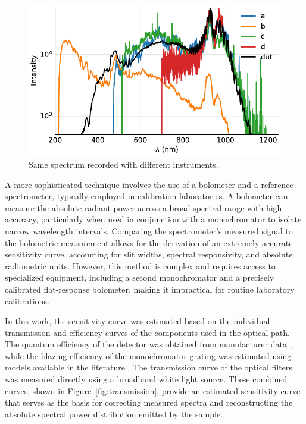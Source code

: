 \documentclass[
	parskip=half,
	a4paper,
]{scrarticle}
\begin{document}
\begin{figure}
    \centering
    \includegraphics{../analysis/figures/efficiency_different.pdf}
    \caption{Same spectrum recorded with different instruments.}
\end{figure}

A more sophisticated technique involves the use of a bolometer and a reference spectrometer, typically employed in calibration laboratories. A bolometer can measure the absolute radiant power across a broad spectral range with high accuracy, particularly when used in conjunction with a monochromator to isolate narrow wavelength intervals. Comparing the spectrometer's measured signal to the bolometric measurement allows for the derivation of an extremely accurate sensitivity curve, accounting for slit widths, spectral responsivity, and absolute radiometric units. However, this method is complex and requires access to specialized equipment, including a second monochromator and a precisely calibrated flat-response bolometer, making it impractical for routine laboratory calibrations.

In this work, the sensitivity curve was estimated based on the individual transmission and efficiency curves of the components used in the optical path. The quantum efficiency of the detector was obtained from manufacturer data \cite{andor_ixonem_nodate}, while the blazing efficiency of the monochromator grating was estimated using models available in the literature \cite{barker_ripple_1984}. The transmission curve of the optical filters was measured directly using a broadband white light source. These combined curves, shown in Figure~\ref{fig:transmission}, provide an estimated sensitivity curve that serves as the basis for correcting measured spectra and reconstructing the absolute spectral power distribution emitted by the sample.
\end{document}
